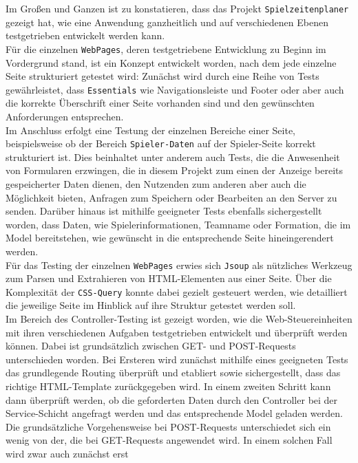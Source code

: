 
Im Großen und Ganzen ist zu konstatieren, dass das Projekt \texttt{Spielzeitenplaner} 
gezeigt hat, wie eine Anwendung ganzheitlich und auf verschiedenen Ebenen testgetrieben 
entwickelt werden kann. \\ 
Für die einzelnen \texttt{WebPages}, deren testgetriebene Entwicklung zu Beginn im 
Vordergrund stand, ist ein Konzept entwickelt worden, nach dem jede einzelne Seite 
strukturiert getestet wird: Zunächst wird durch eine Reihe von Tests gewährleistet, dass 
\texttt{Essentials} wie Navigationsleiste und Footer oder aber auch die korrekte 
Überschrift einer Seite vorhanden sind und den gewünschten Anforderungen entsprechen. \\ 
Im Anschluss erfolgt eine Testung der einzelnen Bereiche einer Seite, beispielsweise ob 
der Bereich \texttt{Spieler-Daten} auf der Spieler-Seite korrekt strukturiert ist. 
Dies beinhaltet unter anderem auch Tests, die die Anwesenheit von Formularen erzwingen, 
die in diesem Projekt zum einen der Anzeige bereits gespeicherter Daten dienen, den 
Nutzenden zum anderen aber auch die Möglichkeit bieten, Anfragen zum Speichern oder 
Bearbeiten an den Server zu senden. Darüber hinaus ist mithilfe geeigneter Tests 
ebenfalls sichergestellt worden, dass Daten, wie Spielerinformationen, Teamname oder 
Formation, die im Model bereitstehen, wie gewünscht in die entsprechende Seite 
hineingerendert werden. \\ 
Für das Testing der einzelnen \texttt{WebPages} erwies sich \texttt{Jsoup} als nützliches Werkzeug zum Parsen und Extrahieren von HTML-Elementen aus einer Seite. Über die 
Komplexität der \texttt{CSS-Query} konnte dabei gezielt gesteuert werden, wie 
detailliert die jeweilige Seite im Hinblick auf ihre Struktur getestet werden soll. \\ 
Im Bereich des Controller-Testing ist gezeigt worden, wie die Web-Steuereinheiten mit 
ihren verschiedenen Aufgaben testgetrieben entwickelt und überprüft werden können. Dabei 
ist grundsätzlich zwischen GET- und POST-Requests unterschieden worden. Bei Ersteren 
wird zunächst mithilfe eines geeigneten Tests das grundlegende Routing überprüft und 
etabliert sowie sichergestellt, dass das richtige HTML-Template zurückgegeben wird. 
In einem zweiten Schritt kann dann überprüft werden, ob die geforderten Daten durch den 
Controller bei der Service-Schicht angefragt werden und das entsprechende Model geladen 
werden. \\ 
Die grundsätzliche Vorgehensweise bei POST-Requests unterschiedet sich ein wenig von der, 
die bei GET-Requests angewendet wird. In einem solchen Fall wird zwar auch zunächst erst 
